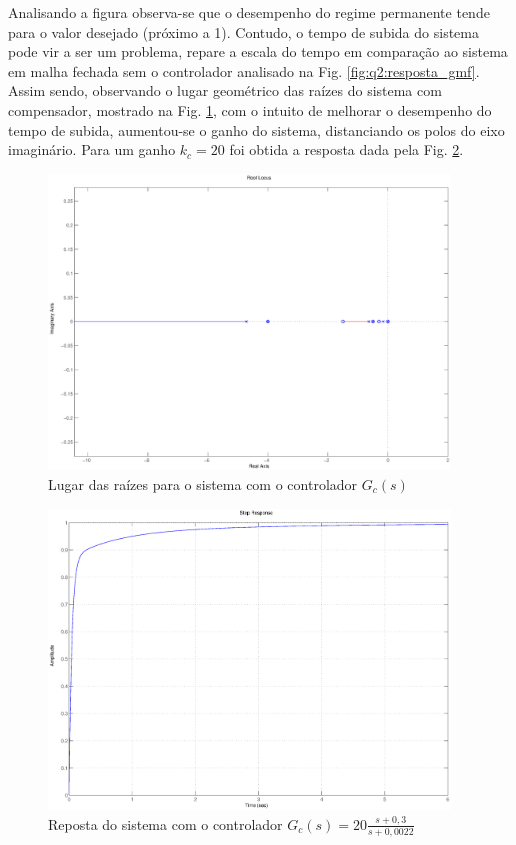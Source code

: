 Analisando a figura observa-se que o desempenho do regime permanente tende para
o valor desejado (próximo a 1). Contudo, o tempo de subida do sistema pode vir a
ser um problema, repare a escala do tempo em comparação ao sistema em malha
fechada sem o controlador analisado na Fig. \ref{fig:q2:resposta_gmf}. Assim
sendo, observando o lugar geométrico das raízes do sistema com compensador,
mostrado na Fig. \ref{fig:q2:rlocus_gcomp1}, com o intuito de melhorar o
desempenho do tempo de subida, aumentou-se o ganho do sistema, distanciando os
polos do eixo imaginário. Para um ganho $k_c = 20$ foi obtida a resposta dada
pela Fig. \ref{fig:q2:resposta_gcomp2}.

\begin{figure}[H]
\centering
\includegraphics[width=0.95\textwidth]{imgs/questao2/rlocus_gcma}
\caption{Lugar das raízes para o sistema com o controlador $G_c(s)$}
\label{fig:q2:rlocus_gcomp1}
\end{figure}
 
\begin{figure}[H]
\centering
\includegraphics[width=0.95\textwidth]{imgs/questao2/resposta_gcomp2}
\caption{Reposta do sistema com o controlador $G_c(s) = 20\frac{s+0,3}{s+0,0022}$ }
\label{fig:q2:resposta_gcomp2}
\end{figure}

